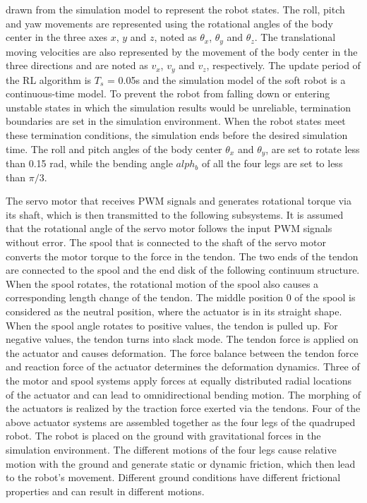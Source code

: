 drawn from the simulation model to represent the robot states. The roll, pitch and yaw movements are represented using the rotational angles of the body center in the three axes $x$, $y$ and $z$, noted as $\theta_x$, $\theta_y$ and $\theta_z$. The translational moving velocities are also represented by the movement of the body center in the three directions and are noted as $v_x$, $v_y$ and $v_z$, respectively. The update period of the RL algorithm is $T_s$ = 0.05s and the simulation model of the soft robot is a continuous-time model. To prevent the robot from falling down or entering unstable states in which the simulation results would be unreliable, termination boundaries are set in the simulation environment. When the robot states meet these termination conditions, the simulation ends before the desired simulation time. The roll and pitch angles of the body center $\theta_x$ and $\theta_y$, are set to rotate less than 0.15 rad, while the bending angle $alph_b$ of all the four legs are set to less than $\pi/3$.

The servo motor that receives \ac{PWM} signals and generates rotational torque via its shaft, which is then transmitted to the following subsystems. It is assumed that the rotational angle of the servo motor follows the input \ac{PWM} signals without error. The spool that is connected to the shaft of the servo motor converts the motor torque to the force in the tendon. The two ends of the tendon are connected to the spool and the end disk of the following continuum structure. When the spool rotates, the rotational motion of the spool also causes a corresponding length change of the tendon. The middle position 0 of the spool is considered as the neutral position, where the actuator is in its straight shape. When the spool angle rotates to positive values, the tendon is pulled up. For negative values, the tendon turns into slack mode. The tendon force is applied on the actuator and causes deformation. The force balance between the tendon force and reaction force of the actuator determines the deformation dynamics. Three of the motor and spool systems apply forces at equally distributed radial locations of the actuator and can lead to omnidirectional bending motion. The morphing of the actuators is realized by the traction force exerted via the tendons. Four of the above actuator systems are assembled together as the four legs of the quadruped robot. The robot is placed on the ground with gravitational forces in the simulation environment. The different motions of the four legs cause relative motion with the ground and generate static or dynamic friction, which then lead to the robot’s movement. Different ground conditions have different frictional properties and can result in different motions.
